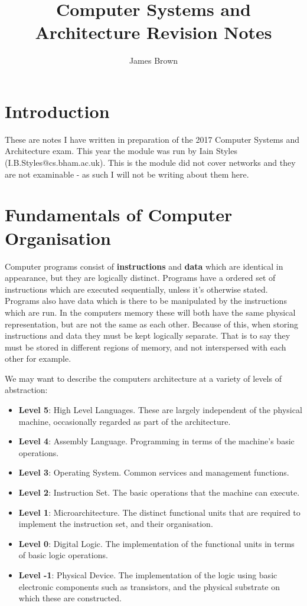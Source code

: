 \documentclass{article}
\title{Computer Systems and Architecture \linebreak Revision Notes}
\author{James Brown}
\begin{document}
	\maketitle
	\newpage
	\tableofcontents
	\newpage
	
	\section{Introduction}
	These are notes I have written in preparation of the 2017 Computer Systems and Architecture exam. This year the module was run by Iain Styles (I.B.Styles@cs.bham.ac.uk). This is the module did not cover networks and they are not examinable - as such I will not be writing about them here.
	
	\section{Fundamentals of Computer Organisation}
	Computer programs consist of \textbf{instructions} and \textbf{data} which are identical in appearance, but they are logically distinct. Programs have a ordered set of instructions which are executed sequentially, unless it's otherwise stated. Programs also have data which is there to be manipulated by the instructions which are run. In the computers memory these will both have the same physical representation, but are not the same as each other. Because of this, when storing instructions and data they must be kept logically separate. That is to say they must be stored in different regions of memory, and not interspersed with each other for example.
	
	\par 
	We may want to describe the computers architecture at a variety of levels of abstraction:
	\begin{itemize}
		\item \textbf{Level 5}: High Level Languages. These are largely independent of the physical machine, occasionally regarded as part of the architecture.
		\item \textbf{Level 4}: Assembly Language. Programming in terms of the machine's basic operations.
		\item \textbf{Level 3}: Operating System. Common services and management functions.
		\item \textbf{Level 2}: Instruction Set. The basic operations that the machine can execute.
		\item \textbf{Level 1}: Microarchitecture. The distinct functional units that are required to implement the instruction set, and their organisation.
		\item \textbf{Level 0}: Digital Logic. The implementation of the functional units in terms of basic logic operations.
		\item \textbf{Level -1}: Physical Device. The implementation of the logic using basic electronic components such as transistors, and the physical substrate on which these are constructed.
	\end{itemize}
	
\end{document}
